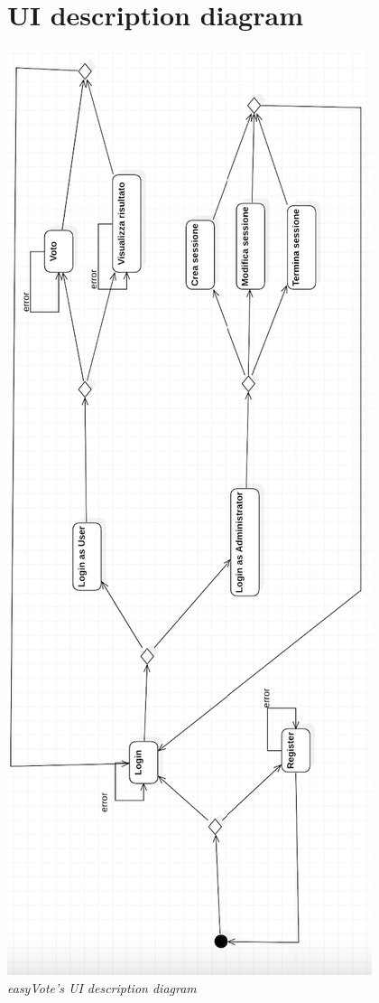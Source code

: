 \documentclass[11pt, oneside]{article}   	%
\begin{document}
\section{UI description diagram}
\begin{center}
    \includegraphics[scale=0.7]{images/uidiagram.png}\\
    \emph{easyVote's UI description diagram}
    \end{center}
    \pagebreak
\end{document}
